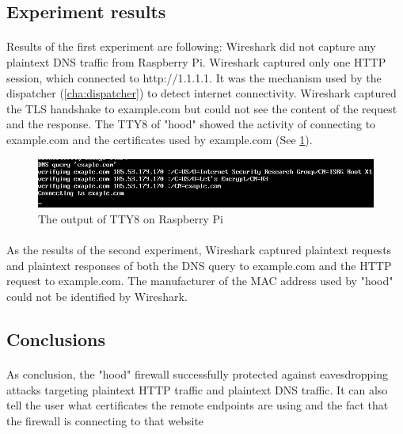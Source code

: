 \documentclass[mscthesis]{usiinfthesis}
\begin{document}
\subsection{Experiment results}
\paragraph{}
Results of the first experiment are following: Wireshark did not capture any plaintext DNS traffic from Raspberry Pi. Wireshark captured only one HTTP session, which connected to http://1.1.1.1. It was the mechanism used by the dispatcher (\cref{cha:dispatcher}) to detect internet connectivity. Wireshark captured the TLS handshake to example.com but could not see the content of the request and the response. The TTY8 of "hood" showed the activity of connecting to example.com and the certificates used by example.com (See \cref{fig:hood-tty-output}).
\begin{figure}[H]
  \includegraphics[width=\textwidth]{penetration_test/hoodcurlexample_tty_output_cropped.png}
  \caption{The output of TTY8 on Raspberry Pi}
  \label{fig:hood-tty-output}
\end{figure}
\paragraph{}
As the results of the second experiment, Wireshark captured plaintext requests and plaintext responses of both the DNS query to example.com and the HTTP request to example.com. The manufacturer of the MAC address used by "hood" could not be identified by Wireshark.

\subsection{Conclusions}
\paragraph{}
As conclusion, the "hood" firewall successfully protected against eavesdropping attacks targeting plaintext HTTP traffic and plaintext DNS traffic. It can also tell the user what certificates the remote endpoints are using and the fact that the firewall is connecting to that website
\end{document}
